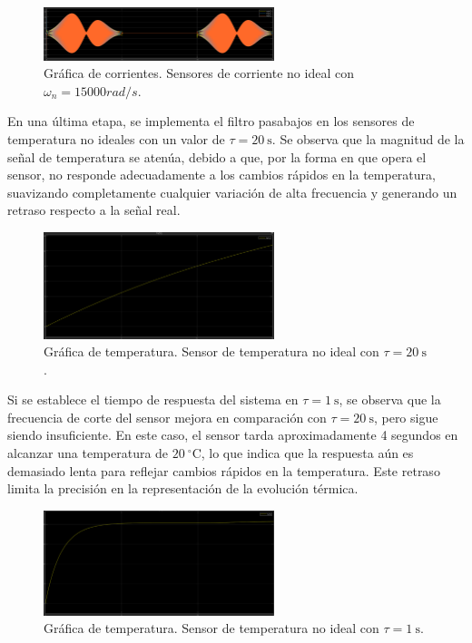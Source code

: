 \documentclass{article}
\begin{document}
 \begin{figure}[H]
    \centering
    \includegraphics[width=0.6\textwidth]{Imagenes/9_corNI_15000_c.png}
    \caption{Gráfica de corrientes. Sensores de corriente no ideal con $\omega_n = 15000 rad/s$.}
\end{figure}

En una última etapa, se implementa el filtro pasabajos en los sensores de temperatura no ideales con un valor de $\tau = 20 \ \text{s}$. Se observa que la magnitud de la señal de temperatura se atenúa, debido a que, por la forma en que opera el sensor, no responde adecuadamente a los cambios rápidos en la temperatura, suavizando completamente cualquier variación de alta frecuencia y generando un retraso respecto a la señal real.

\begin{figure}[H]
    \centering
    \includegraphics[width=0.6\textwidth]{Imagenes/11_temNI_20.png}
    \caption{Gráfica de temperatura. Sensor de temperatura no ideal con $\tau = 20 \ \text{s}$.}
\end{figure}

Si se establece el tiempo de respuesta del sistema en $\tau = 1 \ \text{s}$, se observa que la frecuencia de corte del sensor mejora en comparación con $\tau = 20 \ \text{s}$, pero sigue siendo insuficiente. En este caso, el sensor tarda aproximadamente 4 segundos en alcanzar una temperatura de $20 \ ^\circ \text{C}$, lo que indica que la respuesta aún es demasiado lenta para reflejar cambios rápidos en la temperatura. Este retraso limita la precisión en la representación de la evolución térmica.

\begin{figure}[H]
    \centering
    \includegraphics[width=0.6\textwidth]{Imagenes/12_temNI_1.png}
    \caption{Gráfica de temperatura. Sensor de temperatura no ideal con $\tau = 1 \ \text{s}$.}
\end{figure}
\end{document}
